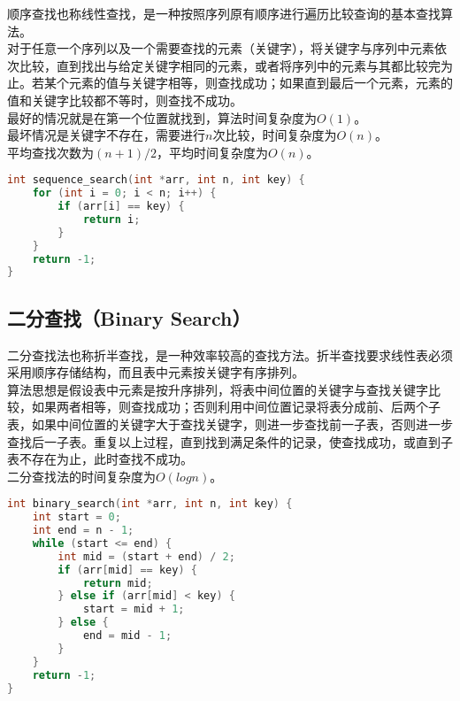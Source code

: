 顺序查找也称线性查找，是一种按照序列原有顺序进行遍历比较查询的基本查找算法。\\

对于任意一个序列以及一个需要查找的元素（关键字），将关键字与序列中元素依次比较，直到找出与给定关键字相同的元素，或者将序列中的元素与其都比较完为止。若某个元素的值与关键字相等，则查找成功；如果直到最后一个元素，元素的值和关键字比较都不等时，则查找不成功。\\

最好的情况就是在第一个位置就找到，算法时间复杂度为$ O(1) $。\\

最坏情况是关键字不存在，需要进行$ n $次比较，时间复杂度为$ O(n) $。\\

平均查找次数为$ (n + 1) / 2 $，平均时间复杂度为$ O(n) $。\\


\begin{lstlisting}[language=C]
int sequence_search(int *arr, int n, int key) {
    for (int i = 0; i < n; i++) {
        if (arr[i] == key) {
            return i;
        }
    }
    return -1;
}
\end{lstlisting}

\vspace{0.5cm}

\subsection{二分查找（Binary Search）}

二分查找法也称折半查找，是一种效率较高的查找方法。折半查找要求线性表必须采用顺序存储结构，而且表中元素按关键字有序排列。\\

算法思想是假设表中元素是按升序排列，将表中间位置的关键字与查找关键字比较，如果两者相等，则查找成功；否则利用中间位置记录将表分成前、后两个子表，如果中间位置的关键字大于查找关键字，则进一步查找前一子表，否则进一步查找后一子表。重复以上过程，直到找到满足条件的记录，使查找成功，或直到子表不存在为止，此时查找不成功。\\

二分查找法的时间复杂度为$ O(logn) $。\\


\begin{lstlisting}[language=C]
int binary_search(int *arr, int n, int key) {
    int start = 0;
    int end = n - 1;
    while (start <= end) {
        int mid = (start + end) / 2;
        if (arr[mid] == key) {
            return mid;
        } else if (arr[mid] < key) {
            start = mid + 1;
        } else {
            end = mid - 1;
        }
    }
    return -1;
}
\end{lstlisting}

